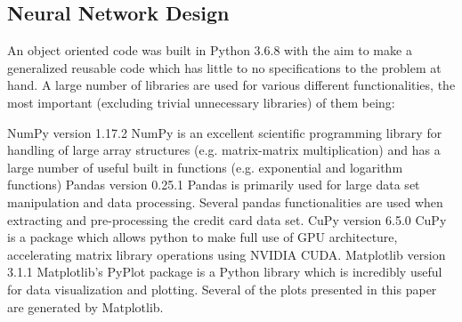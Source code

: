     \subsection{Neural Network Design}
        An object oriented code was built in Python 3.6.8 with the aim to make a generalized reusable code which has little to no specifications to the problem at hand. A large number of libraries are used for various different functionalities, the most important (excluding trivial unnecessary libraries) of them being:
        \begin{outline}[itemize]
            \1 NumPy version 1.17.2
                \2 NumPy is an excellent scientific programming library for handling of large array structures (e.g. matrix-matrix multiplication) and has a large number of useful built in functions (e.g. exponential and logarithm functions)
            \1 Pandas version 0.25.1
                \2 Pandas is primarily used for large data set manipulation and data processing. Several pandas functionalities are used when extracting and pre-processing the credit card data set.
            \1 CuPy version 6.5.0
            	\2 CuPy is a package which allows python to make full use of GPU architecture, accelerating matrix library operations using NVIDIA CUDA.
            \1 Matplotlib version 3.1.1
                \2 Matplotlib's PyPlot package is a Python library which is incredibly useful for data visualization and plotting. Several of the plots presented in this paper are generated by Matplotlib.
        \end{outline}
        
